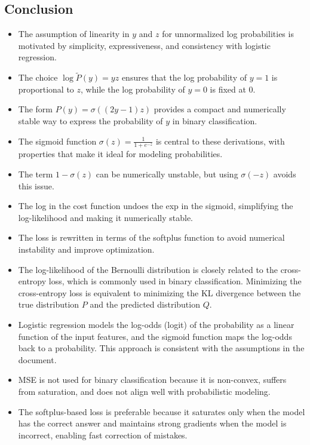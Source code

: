 \begin{notechapter}
\section{Conclusion}
\begin{itemize}
    \item The assumption of linearity in \( y \) and \( z \) for unnormalized log probabilities is motivated by simplicity, expressiveness, and consistency with logistic regression.
    \item The choice \( \log \tilde{P}(y) = yz \) ensures that the log probability of \( y = 1 \) is proportional to \( z \), while the log probability of \( y = 0 \) is fixed at 0.
    \item The form \( P(y) = \sigma((2y - 1)z) \) provides a compact and numerically stable way to express the probability of \( y \) in binary classification.
    \item The sigmoid function \( \sigma(z) = \frac{1}{1 + e^{-z}} \) is central to these derivations, with properties that make it ideal for modeling probabilities.
    \item The term \( 1 - \sigma(z) \) can be numerically unstable, but using \( \sigma(-z) \) avoids this issue.
    \item The log in the cost function undoes the exp in the sigmoid, simplifying the log-likelihood and making it numerically stable.
    \item The loss is rewritten in terms of the softplus function to avoid numerical instability and improve optimization.
    \item The log-likelihood of the Bernoulli distribution is closely related to the cross-entropy loss, which is commonly used in binary classification. Minimizing the cross-entropy loss is equivalent to minimizing the KL divergence between the true distribution \( P \) and the predicted distribution \( Q \).
    \item Logistic regression models the log-odds (logit) of the probability as a linear function of the input features, and the sigmoid function maps the log-odds back to a probability. This approach is consistent with the assumptions in the document.
    \item MSE is not used for binary classification because it is non-convex, suffers from saturation, and does not align well with probabilistic modeling.
    \item The softplus-based loss is preferable because it saturates only when the model has the correct answer and maintains strong gradients when the model is incorrect, enabling fast correction of mistakes.

\end{itemize}
\end{notechapter}
